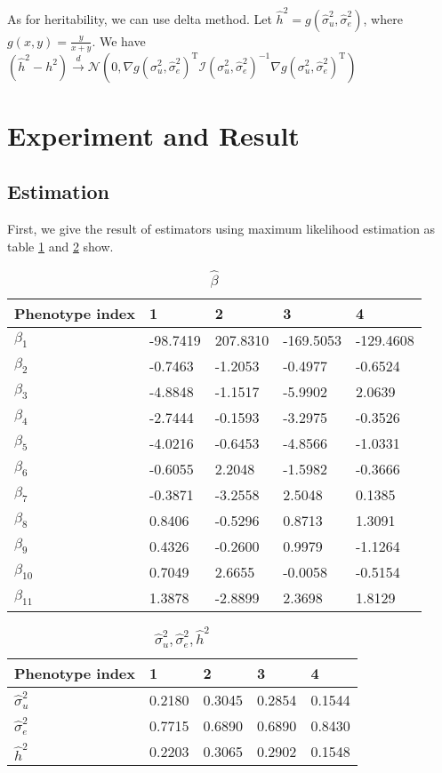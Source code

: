 \documentclass{article}
\begin{document}
As for heritability, we can use delta method. Let $ \hat{h}^{2} = g(\hat{\sigma}^{2}_{u}, \hat{\sigma}^{2}_{e}) $, where $ g(x,y) = \frac{y}{x+y} $.  We have $ (\hat{h}^{2} - h^{2}) \xrightarrow{d} \mathcal{N}(0, \nabla g(\sigma^{2}_{u}, \hat{\sigma}^{2}_{e})^{\text{T}} \mathcal{I}(\sigma^{2}_{u}, \hat{\sigma}^{2}_{e})^{-1} \nabla g(\sigma^{2}_{u}, \hat{\sigma}^{2}_{e})^{\text{T}} ) $

\section{Experiment and Result}

\subsection{Estimation}

First, we give the result of estimators using maximum likelihood estimation as table \ref{table_beta} and \ref{table_sigma_h} show.

\begin{table}[htbp]
	\caption{$ \hat{\beta} $}
	\label{table_beta}
	\centering
	\begin{tabular}{lllll}
		\toprule
		Phenotype index	& 1 & 2 & 3 & 4 \\
		\midrule
		$ \beta_1 $ & -98.7419 & 207.8310 & -169.5053 & -129.4608 \\
		$ \beta_2 $ & -0.7463 & -1.2053 & -0.4977 & -0.6524 \\
		$ \beta_3 $ & -4.8848 & -1.1517 & -5.9902 & 2.0639 \\
		$ \beta_4 $ & -2.7444 & -0.1593 & -3.2975 & -0.3526 \\
		$ \beta_5 $ & -4.0216 & -0.6453 & -4.8566 & -1.0331 \\
		$ \beta_6 $ & -0.6055 & 2.2048 & -1.5982 & -0.3666 \\
		$ \beta_7 $ & -0.3871 & -3.2558 & 2.5048 & 0.1385 \\
		$ \beta_8 $ & 0.8406 & -0.5296 & 0.8713 & 1.3091 \\
		$ \beta_9 $ & 0.4326 & -0.2600 & 0.9979 & -1.1264 \\
		$ \beta_{10} $ & 0.7049 & 2.6655 & -0.0058 & -0.5154 \\
		$ \beta_{11} $ & 1.3878 & -2.8899 & 2.3698 & 1.8129 \\
		\bottomrule
	\end{tabular}
\end{table}

\begin{table}[htbp]
	\caption{$ \hat{\sigma}^{2}_{u}, \hat{\sigma}^{2}_{e}, \hat{h}^{2} $}
	\label{table_sigma_h}
	\centering
	\begin{tabular}{lllll}
		\toprule
		Phenotype index	& 1 & 2 & 3 & 4 \\
		\midrule
		$ \hat{\sigma}^{2}_{u} $ & 0.2180 & 0.3045 & 0.2854 & 0.1544 \\
		$ \hat{\sigma}^{2}_{e} $ & 0.7715 & 0.6890 & 0.6890 & 0.8430 \\
		$ \hat{h}^{2} $ & 0.2203 & 0.3065 & 0.2902 & 0.1548 \\
		\bottomrule
	\end{tabular}
\end{table}
\end{document}
